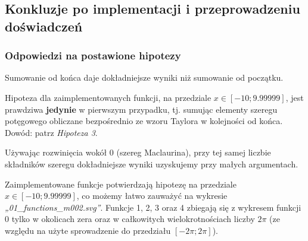 \documentclass[12pt]{article}
\newenvironment{hypothesis}[2][Hipoteza]{\begin{trivlist}
\item[\hskip \labelsep {\bfseries #1}\hskip \labelsep {\bfseries #2.}]}{\end{trivlist}}
\begin{document}
\subsection{Konkluzje po implementacji i przeprowadzeniu doświadczeń}
\subsubsection{Odpowiedzi na postawione hipotezy}

\begin{hypothesis}{1}
Sumowanie od końca daje dokładniejsze wyniki niż sumowanie od początku.
\end{hypothesis}
Hipoteza dla zaimplementowanych funkcji, na przedziale $x \in [-10; 9.99999]$, jest prawdziwa \textbf{jedynie} w pierwszym przypadku, tj. sumując elementy szeregu potęgowego obliczane bezpośrednio ze wzoru Taylora w kolejności od końca.\\
Dowód: patrz \textit{Hipoteza 3}.

\begin{hypothesis}{2}
Używając rozwinięcia wokół 0 (szereg Maclaurina), przy tej samej liczbie składników szeregu dokładniejsze wyniki uzyskujemy przy małych argumentach.
\end{hypothesis}
Zaimplementowane funkcje potwierdzają hipotezę na przedziale $x \in [-10; 9.99999]$, co możemy łatwo zauważyć na wykresie \textit{„01\_functions\_m002.svg”}. Funkcje 1, 2, 3 oraz 4 zbiegają się z wykresem funkcji 0 tylko w okolicach zera oraz w całkowitych wielokrotnościach liczby $2\pi$ (ze względu na użyte sprowadzenie do przedziału $[-2\pi;2\pi]$).
\end{document}
